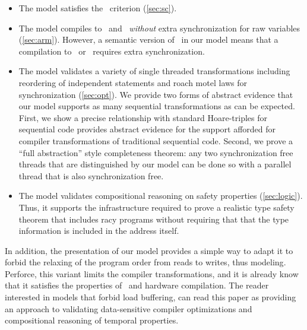 \begin{itemize}
\item The model satisfies the \drfsc\ criterion  (\textsection\ref{sec:sc}).

\item The model compiles to \armeight\ and \tso\ {\em without} extra synchronization for raw variables  (\textsection\ref{sec:arm}).
However, a semantic version of \mca\ in our model means that a compilation to \armseven\ or \ppc\ requires extra synchronization.  

\item The model validates a variety of single threaded transformations including reordering of independent statements and roach motel laws for synchronization  (\textsection\ref{sec:opt}).
%
We provide two forms of abstract evidence that our model supports as many sequential transformations as can be expected.  First, we show a precise relationship with standard Hoare-triples for sequential code provides abstract evidence for the support afforded for compiler  transformations of traditional sequential code.  Second, we prove a ``full abstraction'' style completeness  theorem: any two synchronization free threads that are distinguished by our model can be done so with a parallel thread that is also synchronization free. 

\item The model validates compositional reasoning on safety properties (\textsection\ref{sec:logic}).  Thus, it supports the infrastructure required to prove a realistic type safety theorem that includes racy programs without requiring that that the type information is included in the address itself.
\end{itemize}
In addition, the presentation of our model provides a simple way to adapt it to forbid the relaxing of the program order from reads to writes, thus modeling\cite{Dolan:2018:BDR:3192366.3192421,BoehmOOTA}.  Perforce, this variant limits the compiler transformations, and it is already know that it satisfies the properties of \drfsc\ and hardware compilation.   The reader interested in models that forbid load buffering, can read this paper as providing an approach to validating data-sensitive compiler optimizations and compositional reasoning of temporal properties.   



